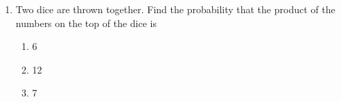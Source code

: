 \begin{enumerate}[label=\thesection.\arabic*,ref=\thesection.\theenumi]
	\item Two dice are thrown together. Find the probability that the product of the numbers
on the top of the dice is
\begin{enumerate}
\item 6
\item 12
\item 7
\end{enumerate}
		\solution
		
\end{enumerate}
